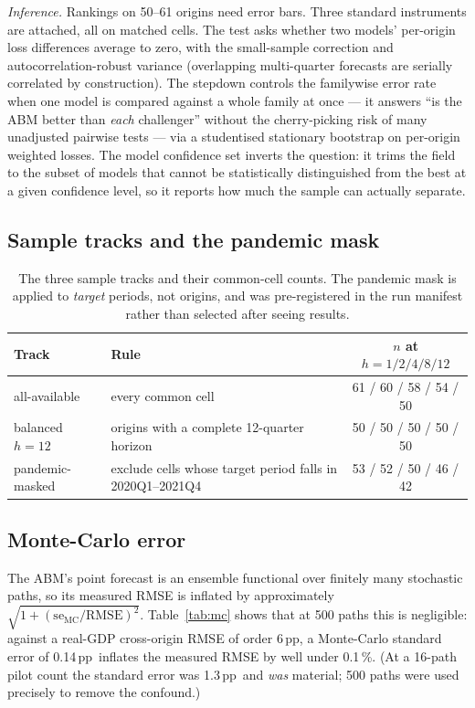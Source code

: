 \documentclass[11pt,a4paper]{article}
\newcommand{\pp}{\,pp}
\begin{document}
\emph{Inference.} Rankings on 50--61 origins need error bars. Three standard instruments are
attached, all on matched cells. The \citet{dieboldmariano1995} test asks whether two models'
per-origin loss differences average to zero, with the \citet{harveyleybournenewbold1997}
small-sample correction and autocorrelation-robust variance (overlapping multi-quarter forecasts
are serially correlated by construction). The \citet{romanowolf2005} stepdown controls the
familywise error rate when one model is compared against a whole family at once --- it answers
``is the ABM better than \emph{each} challenger'' without the cherry-picking risk of many
unadjusted pairwise tests --- via a studentised stationary bootstrap on per-origin weighted
losses. The \citet{hansenlundenason2011} model confidence set inverts the question: it trims the
field to the subset of models that cannot be statistically distinguished from the best at a given
confidence level, so it reports how much the sample can actually separate.

\subsection{Sample tracks and the pandemic mask}

\begin{table}[h]
\centering
\caption{The three sample tracks and their common-cell counts. The pandemic mask is applied to
\emph{target} periods, not origins, and was pre-registered in the run manifest rather than selected
after seeing results.}
\label{tab:tracks}
\small
\begin{tabular}{@{}llc@{}}
\toprule
Track & Rule & $n$ at $h=1/2/4/8/12$ \\
\midrule
all-available & every common cell & 61 / 60 / 58 / 54 / 50 \\
balanced $h{=}12$ & origins with a complete 12-quarter horizon & 50 / 50 / 50 / 50 / 50 \\
pandemic-masked & exclude cells whose target period falls in 2020Q1--2021Q4 & 53 / 52 / 50 / 46 / 42 \\
\bottomrule
\end{tabular}
\end{table}

\subsection{Monte-Carlo error}

The ABM's point forecast is an ensemble functional over finitely many stochastic paths, so its
measured RMSE is inflated by approximately $\sqrt{1+(\mathrm{se}_{\mathrm{MC}}/\mathrm{RMSE})^2}$.
Table~\ref{tab:mc} shows that at 500 paths this is negligible: against a real-GDP cross-origin
RMSE of order 6\pp, a Monte-Carlo standard error of 0.14\pp\ inflates the measured RMSE by well
under 0.1\,\%. (At a 16-path pilot count the standard error was 1.3\pp\ and \emph{was} material;
500 paths were used precisely to remove the confound.)
\end{document}
